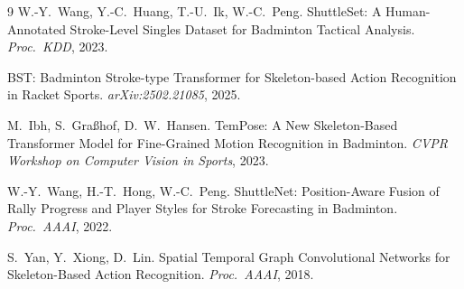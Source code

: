 \documentclass[11pt,a4paper]{article}
\begin{document}
\begin{thebibliography}{9}
W.-Y.\ Wang, Y.-C.\ Huang, T.-U.\ Ik, W.-C.\ Peng.
ShuttleSet: A Human-Annotated Stroke-Level Singles Dataset for Badminton Tactical Analysis.
\textit{Proc.\ KDD}, 2023.

BST: Badminton Stroke-type Transformer for Skeleton-based Action Recognition in Racket Sports.
\textit{arXiv:2502.21085}, 2025.

M.\ Ibh, S.\ Gra{\ss}hof, D.~W.\ Hansen.
TemPose: A New Skeleton-Based Transformer Model for Fine-Grained Motion Recognition in Badminton.
\textit{CVPR Workshop on Computer Vision in Sports}, 2023.

W.-Y.\ Wang, H.-T.\ Hong, W.-C.\ Peng.
ShuttleNet: Position-Aware Fusion of Rally Progress and Player Styles for Stroke Forecasting in Badminton.
\textit{Proc.\ AAAI}, 2022.

S.\ Yan, Y.\ Xiong, D.\ Lin.
Spatial Temporal Graph Convolutional Networks for Skeleton-Based Action Recognition.
\textit{Proc.\ AAAI}, 2018.
\end{thebibliography}
\end{document}
